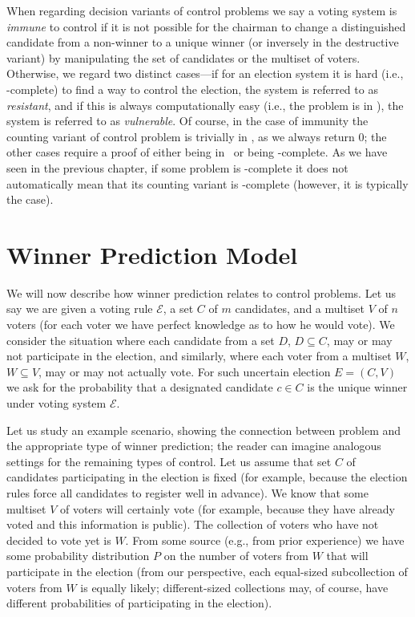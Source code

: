 When regarding decision variants of control problems we say a voting system is \emph{immune} to control if it is not possible for the chairman to change a distinguished candidate from a non-winner to a unique winner (or inversely in the destructive variant) by ma\-ni\-pu\-la\-ting the set of candidates or the multiset of voters.
Otherwise, we regard two distinct cases---if for an election system it is hard (i.e., \NPclass-complete) to find a way to control the election, the system is referred to as \emph{resistant}, and if this is always computationally easy (i.e., the problem is in \Pclass), the system is referred to as \emph{vulnerable}.
Of course, in the case of immunity the counting variant of control problem is trivially in \FPclass, as we always return 0; the other cases require a proof of either being in \FPclass\ or being \sharpPclass-complete.
As we have seen in the previous chapter, if some problem is \NPclass-complete it does not automatically mean that its counting variant is \sharpPclass-complete (however, it is typically the case).

\section{Winner Prediction Model} \label{sec:prediction}

We will now describe how winner prediction relates to control problems.
Let us say we are given a voting rule $\mathcal{E}$, a set $C$ of $m$ candidates, and a multiset $V$ of $n$ voters (for each voter we have perfect knowledge as to how he would vote).
We consider the situation where each candidate from a set $D$, $D\subseteq C$, may or may not participate in the election, and similarly, where each voter from a multiset $W$, $W\subseteq V$, may or may not actually vote.
For such uncertain election $E=(C,V)$ we ask for the probability that a designated candidate $c\in C$ is the unique winner under voting system $\mathcal{E}$.

Let us study an example scenario, showing the connection between problem  and the appropriate type of winner prediction; the reader can imagine analogous settings for the remaining types of control.
Let us assume that set $C$ of candidates participating in the election is fixed (for example, because the election rules force all candidates to register well in advance).
We know that some multiset $V$ of voters will certainly vote (for example, because they have already voted and this information is public).
The collection of voters who have not decided to vote yet is $W$\!.
From some source (e.g., from prior experience) we have some probability distribution $P$ on the number of voters from $W$ that will participate in the election (from our perspective, each equal-sized subcollection of voters from $W$ is equally likely; different-sized collections may, of course, have different probabilities of participating in the election).

